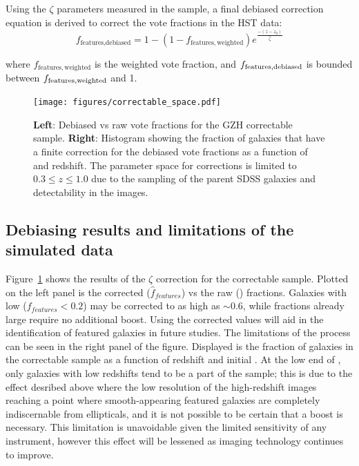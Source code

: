 Using the $\zeta$ parameters measured in the \ferengi{} sample, a final debiased correction equation is derived to correct the \ffeatures{} vote fractions in the HST data:
\begin{equation}
f_\textrm{features,debiased} = 1 - (1 - f_\mathrm{features,weighted})e^{\frac{-(z-z_0)}{\hat\zeta}}
\label{eqn:fzeta_mod}
\end{equation}

\noindent where $f_\mathrm{features,weighted}$ is the weighted vote fraction, and $f_{\rm features,debiased}$ is bounded 
between $f_{\rm features,weighted}$ and 1. 

\begin{figure}
\center
\texttt{[image: figures/correctable\_space.pdf]}
\caption{\textbf{Left}: Debiased vs raw vote fractions for the GZH correctable sample. \textbf{Right}: Histogram showing the fraction of galaxies that have a finite correction for the debiased vote fractions \ffeaturesdebiased{} as a function of \ffeatures{}
and redshift. The parameter space for corrections is limited to $0.3 \leq z \leq 1.0$
due to the sampling of the parent SDSS galaxies and detectability in the \ferengi{} images.
}
\label{fig:correctable_fraction}
\end{figure}



\subsection{Debiasing results and limitations of the \ferengi{} simulated data}
Figure~\ref{fig:correctable_fraction} shows the results of the $\zeta$ correction for the correctable sample. Plotted on the left panel is the corrected ($\hat f_{features}$) vs the raw (\ffeatures{}) fractions. Galaxies with low ($ f_{features} < 0.2$) may be corrected to as high as $\sim 0.6$, while fractions already large require no additional boost. Using the corrected values will aid in the identification of featured galaxies in future studies. The limitations of the process can be seen in the right panel of the figure. Displayed is the fraction of galaxies in the correctable sample as a function of redshift and initial \ffeatures{}. At the low end of \ffeatures{}, only galaxies with low redshifts tend to be a part of the sample; this is due to the effect desribed above where the low resolution of the high-redshift images reaching a point where smooth-appearing featured galaxies are completely indiscernable from ellipticals, and it is not possible to be certain that a boost is necessary. This limitation is unavoidable given the limited sensitivity of any instrument, however this effect will be lessened as imaging technology continues to improve. 

